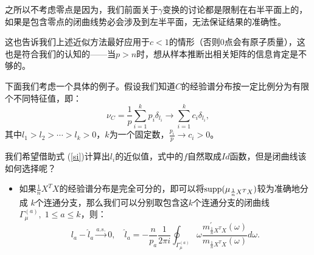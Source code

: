 \documentclass[UTF8,12pt]{ctexart}
\begin{document}
之所以不考虑零点是因为，我们前面关于$\gamma$变换的讨论都是限制在右半平面上的，如果是包含零点的闭曲线势必会涉及到左半平面，无法保证结果的准确性。

这也告诉我们上述近似方法最好应用于$c<1$的情形（否则0点会有原子质量），这也是符合我们的认知的——当$p>n$时，想从样本推断出相关矩阵的信息肯定是不够的。

下面我们考虑一个具体的例子。假设我们知道$C$的经验谱分布按一定比例分为有限个不同特征值，即：
\[
    \nu_C = \frac{1}{p}\sum\limits_{i=1}^{k}p_i\delta_{l_i} \rightarrow 
    \sum\limits_{i=1}^{k}c_i\delta_{l_i},
\]  
其中$l_1 > l_2 > \cdots > l_k > 0$，$k$为一个固定数，$\frac{p_i}{p} \rightarrow c_i  > 0$。

我们希望借助式 (\ref{si})计算出$l_i$的近似值，式中的$f$自然取成$Id$函数，但是闭曲线该如何选择呢？

\begin{itemize}
    \item 如果$\frac{1}{n}X^T X$的经验谱分布是完全可分的，即可以将$\textup{supp}(\mu_{\frac{1}{n}X^T X})$较为准确地分成
    $k$个连通分支，那么我们可以分别取包含这$k$个连通分支的闭曲线$\Gamma_\mu^{(a)},\; 1 \leq a \leq k$，则：
    \[
        l_a - \hat{l}_a \stackrel{a.s.}{\longrightarrow} 0, \quad
        \hat{l}_a = -\frac{n}{p_a}\frac{1}{2\pi i}\oint_{\Gamma_\mu^{(a)}}\omega
        \frac{m_{\frac{1}{n}X^T X}^\prime (\omega)}{m_{\frac{1}{n}X^T X} (\omega)}d\omega.
    \]  


\end{itemize}
\end{document}

